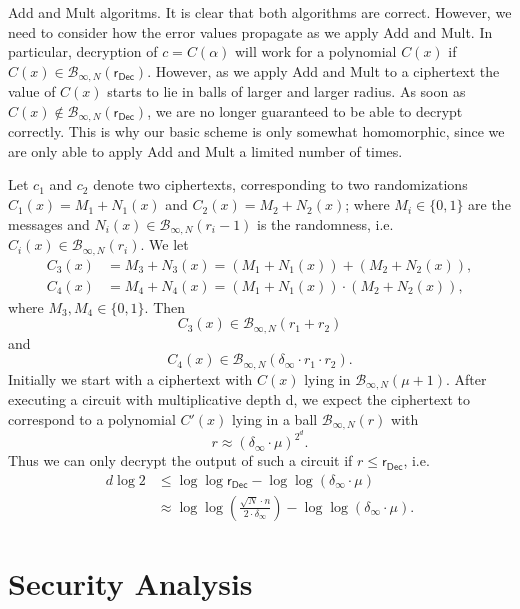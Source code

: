 \documentclass[a4paper, 12pt]{article}
\newcommand{\mc}[1]{\mathcal{#1}}
\newcommand{\tsf}[1]{\textsf{#1}}
\begin{document}
	\begin{paralgorithm}{\tsf{Add} and \tsf{Mult} algoritms.}
		It is clear that both algorithms are correct. However, we need to consider how the error values propagate as we apply \tsf{Add} and \tsf{Mult}. 
		In particular, decryption of $c = C(\alpha)$ will work for a polynomial $C(x)$ if $C(x) \in \mc{B}_{\infty, N}(\tsf{r}_\tsf{Dec})$. 
		However, as we apply \tsf{Add} and \tsf{Mult} to a ciphertext the value of $C(x)$ starts to lie in balls of larger and larger radius. 
		As soon as $C(x) \not\in \mc{B}_{\infty, N}(\tsf{r}_\tsf{Dec})$, we are no longer guaranteed to be able to decrypt correctly.
		This is why our basic scheme is only somewhat homomorphic, since we are only able to apply \tsf{Add} and \tsf{Mult} a limited number of times.
		
		Let $c_1$ and $c_2$ denote two ciphertexts, corresponding to two randomizations $C_1(x) = M_1+N_1(x)$ and $C_2(x) = M_2+N_2(x)$; where $M_i \in \{0, 1\}$ are the messages and $N_i(x) \in \mc{B}_{\infty, N}(r_i-1)$ is the randomness, i.e. $C_i(x) \in \mc{B}_{\infty, N}(r_i)$. 
		We let
		\begin{align*}
			C_3(x) &= M_3+N_3(x) = (M_1+N_1(x)) + (M_2+N_2(x)),\\
			C_4(x) &= M_4+N_4(x) = (M_1+N_1(x)) \cdot (M_2+N_2(x)),
		\end{align*} %
		where $M_3, M_4 \in \{0, 1\}$. Then
		\[
			C_3(x) \in \mc{B}_{\infty, N}(r_1+r_2)
		\]
		and
		\[
			C_4(x) \in \mc{B}_{\infty, N}(\delta_\infty \cdot r_1 \cdot r_2).
		\]
		Initially we start with a ciphertext with $C(x)$ lying in $\mc{B}_{\infty, N}(\mu + 1)$.
		After executing a circuit with multiplicative depth d, we expect the ciphertext to correspond to a polynomial $C'(x)$ lying in a ball $\mc{B}_{\infty, N}(r)$ with
		\[
			r \approx (\delta_\infty \cdot \mu)^{2^d}.
		\]
		Thus we can only decrypt the output of such a circuit if $r \leqslant \tsf{r}_\tsf{Dec}$, i.e.
		\begin{align*}
			d \log 2 &\leqslant \log{\log{\tsf{r}_\tsf{Dec}}} - \log{\log{(\delta_\infty \cdot \mu)}} 
			\\ &\approx \log{\log{\left(\frac{\sqrt{N} \cdot n}{2 \cdot \delta_\infty}\right)}} - \log{\log{(\delta_\infty \cdot \mu)}}.
		\end{align*}
	\end{paralgorithm}
	
	\section{Security Analysis}
	
\end{document}
